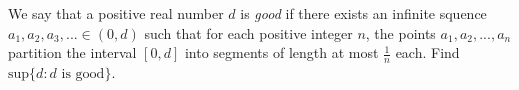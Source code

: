 We say that a positive real number $d$ is \emph{good} if there exists an infinite squence $a_1,a_2,a_3,...\in (0,d)$ such that for each positive integer $n$, the points $a_1,a_2,...,a_n$ partition the interval $[0,d]$ into segments of length at most $\frac{1}{n}$ each. Find $\text{sup}\{d : d  \text{ is  good}\}$.

